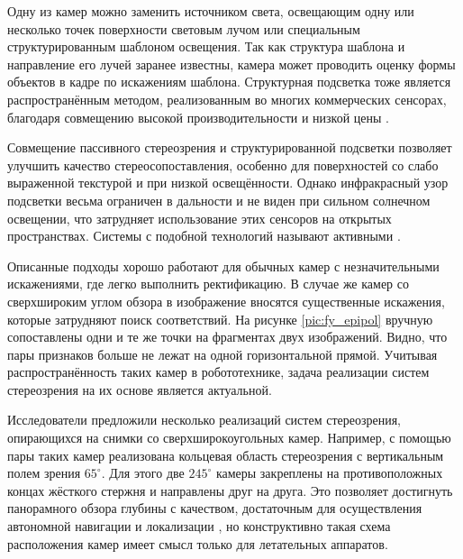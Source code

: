 Одну из камер можно заменить источником  света, освещающим одну или несколько точек поверхности световым лучом или специальным структурированным шаблоном освещения.  %
Так как структура шаблона и направление его  лучей заранее известны, камера может проводить оценку формы объектов в кадре по искажениям шаблона\cite{shapiro}. 
Структурная подсветка тоже является распространённым методом, реализованным во многих коммерческих сенсорах, благодаря совмещению высокой производительности 
и  низкой цены \cite{struct_light}.  

Совмещение пассивного стереозрения и структурированной подсветки позволяет улучшить качество стереосопоставления, особенно для поверхностей со слабо выраженной текстурой
и при низкой освещённости. Однако инфракрасный узор подсветки весьма ограничен в дальности и не виден при сильном солнечном освещении, что затрудняет использование этих    %
сенсоров на открытых пространствах. Системы с подобной технологий называют активными \cite{kinect_perf}. 


Описанные подходы хорошо работают для обычных камер с незначительными искажениями, где легко выполнить ректификацию. 		
В случае  же камер со сверхшироким углом обзора в изображение вносятся существенные искажения, которые затрудняют поиск соответствий. На 
рисунке \ref{pic:fy_epipol} вручную сопоставлены одни и те же точки на фрагментах двух изображений. Видно, что пары признаков больше не лежат
на одной горизонтальной прямой.  Учитывая распространённость таких  камер в робототехнике, задача реализации систем стереозрения на их основе 
является актуальной.    %


Исследователи предложили несколько реализаций систем стереозрения, опирающихся на снимки со сверхширокоугольных камер. 
Например, с помощью  пары таких камер реализована  кольцевая область стереозрения с вертикальным  %
полем зрения $65^\circ$\cite{omni_stereo}. Для этого две $245^\circ$ камеры закреплены на противоположных концах жёсткого стержня 
и направлены друг на друга.  
Это позволяет достигнуть панорамного обзора глубины с качеством, достаточным для осуществления автономной навигации и
локализации \cite{omni_copter}, но конструктивно такая схема расположения камер имеет смысл только для летательных аппаратов.  

